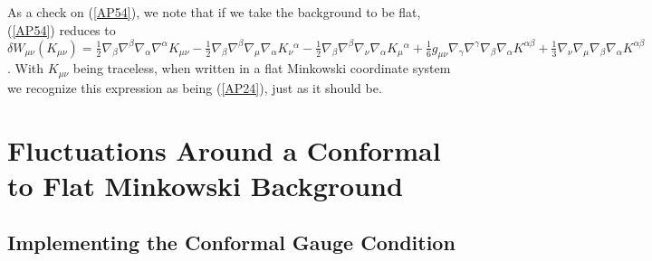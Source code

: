 \documentclass[aps]{revtex4}
\begin{document}
As a check on (\ref{AP54}), we note that if we take the background to be flat,  (\ref{AP54}) reduces to $\delta W_{\mu\nu}^{}(K_{\mu\nu})=\tfrac{1}{2} \nabla_{\beta}\nabla^{\beta}\nabla_{\alpha}\nabla^{\alpha}K_{\mu \nu} -  \tfrac{1}{2} \nabla_{\beta}\nabla^{\beta}\nabla_{\mu}\nabla_{\alpha}K_{\nu}{}^{\alpha} -  \tfrac{1}{2} \nabla_{\beta}\nabla^{\beta}\nabla_{\nu}\nabla_{\alpha}K_{\mu}{}^{\alpha} + \tfrac{1}{6} g_{\mu \nu} \nabla_{\gamma}\nabla^{\gamma}\nabla_{\beta}\nabla_{\alpha}K^{\alpha \beta}+ \tfrac{1}{3} \nabla_{\nu}\nabla_{\mu}\nabla_{\beta}\nabla_{\alpha}K^{\alpha \beta}$. With $K_{\mu\nu}$ being traceless, when written in a flat Minkowski coordinate system we recognize this expression as being (\ref{AP24}), just as it should be.



\section{Fluctuations Around a Conformal to Flat Minkowski Background}
\label{S4}

\subsection{Implementing the Conformal Gauge Condition}
\end{document}
